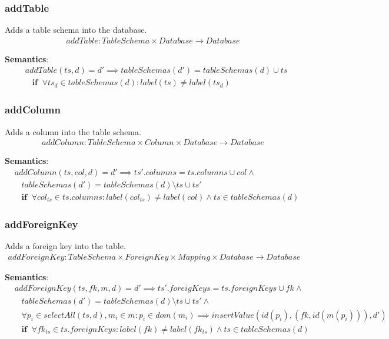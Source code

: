 \documentclass[10pt]{article}
\begin{document}
\subsubsection{addTable}
Adds a table schema into the database.
\begin{align}
addTable: TableSchema \times Database \rightarrow Database
\end{align}

\noindent \textbf{Semantics}:
\begin{align}
& addTable(ts, d) = d' \implies tableSchemas(d') = tableSchemas(d) \cup ts \nonumber \\
& \;\;\; \mathbf{if}  \;\; \forall ts_d \in tableSchemas(d) : label(ts) \neq label(ts_d)
\end{align}

\subsubsection{addColumn}
Adds a column into the table schema.
\begin{align}
addColumn: TableSchema \times Column \times Database \rightarrow Database
\end{align}

\noindent \textbf{Semantics}:
\begin{align}
& addColumn(ts, col, d) = d' \implies ts'.columns = ts.columns \cup col \land \nonumber \\
& \;\;\; tableSchemas(d') = tableSchemas(d) \setminus ts \cup ts' \nonumber \\
& \;\;\; \mathbf{if}  \;\;  \forall col_{ts} \in ts.columns : label(col_{ts}) \neq label(col) \land ts \in tableSchemas(d)
\end{align}

\subsubsection{addForeignKey}
Adds a foreign key into the table.
\begin{align}
addForeignKey: TableSchema \times ForeignKey \times Mapping \times Database \rightarrow Database
\end{align}

\noindent \textbf{Semantics}:
\begin{align}
& addForeignKey(ts, fk, m, d) = d' \implies ts'.foreigKeys = ts.foreignKeys \cup fk \land \nonumber \\
& \;\;\; tableSchemas(d') = tableSchemas(d) \setminus ts \cup ts' \land \nonumber \\
& \;\;\; \forall p_i \in selectAll(ts, d), m_i \in m : p_i \in dom(m_i) \implies insertValue(id(p_i), (fk, id(m(p_i))), d')  \nonumber \\
& \;\;\; \mathbf{if}  \;\;  \forall fk_{ts} \in ts.foreignKeys : label(fk) \neq label(fk_{ts}) \land ts \in tableSchemas(d)
\end{align}
\end{document}
